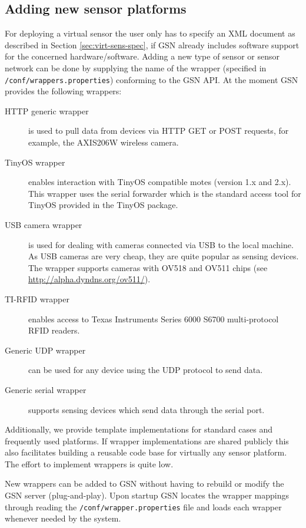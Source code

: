 \subsection{Adding new sensor platforms}
\label{sec:adding-new-sensor}

For deploying a virtual sensor the user only has to specify an XML document as described in Section \ref{sec:virt-sens-spec}, if GSN already
includes software support for the concerned hardware/software. Adding a new
type of sensor or sensor network can be done by supplying the name of the wrapper (specified in \texttt{/conf/wrappers.properties})
conforming to the GSN API. At the moment GSN provides the following wrappers:

\begin{description}
\item[HTTP generic wrapper] is used to pull data from devices via HTTP GET
  or POST requests, for example, the AXIS206W wireless camera.

\item[TinyOS wrapper] enables interaction with TinyOS compatible
motes (version 1.x and 2.x). This wrapper uses the serial forwarder which is
the standard access tool for TinyOS provided in the TinyOS package.

\item[USB camera wrapper] is used for dealing with cameras connected via USB 
  to the local machine. As USB cameras are very cheap, they are quite
  popular as sensing devices. The wrapper supports cameras
  with OV518 and OV511 chips (see \url{http://alpha.dyndns.org/ov511/}).
  
\item[TI-RFID wrapper] enables access to Texas Instruments Series 6000 S6700
  multi-protocol RFID readers.

\item[Generic UDP wrapper] can be used for any device using the UDP protocol to
  send data.
  
\item[Generic serial wrapper] supports sensing devices which send data through
  the serial port.
\end{description}

Additionally, we provide template implementations for standard cases and
frequently used platforms. If wrapper implementations are shared publicly this
also facilitates building a reusable code base for virtually any sensor
platform. The effort to implement wrappers is quite low.

New wrappers can be added to GSN without having to rebuild or modify the GSN
server (plug-and-play). Upon startup GSN locates the wrapper mappings through reading
the \texttt{/conf/wrapper.properties} file and loads each wrapper whenever needed by the system.

